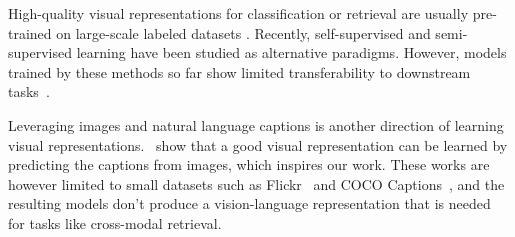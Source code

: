 \documentclass{article}
\begin{document}
High-quality visual representations for classification or retrieval are usually pre-trained on large-scale labeled datasets \cite{mahajan:wsl, kolensnikov:bit, dosovitskiy:vit, juan:graphrise}. Recently, self-supervised \citep{chen:simclr, tian:cmc, he:moco, misra:pirl, li:pcl, grill:byol, caron:swav} and semi-supervised learning \citep{yalniz2019billion, xie:noisy_student, pham:mpl} have been studied as alternative paradigms. %
However, models trained by these methods so far show limited transferability to downstream tasks~\cite{zoph2020rethinking}. %


Leveraging images and natural language captions is another direction of learning visual representations.~\citet{joulin:flickr,li:ngram,desai:virtex,sariyildiz2020learning,zhang2020contrastive} show that a good visual representation can be learned by predicting the captions from images, which inspires our work. These works are however limited to small datasets such as Flickr~\cite{joulin:flickr,li:ngram} and COCO Captions~\cite{desai:virtex,sariyildiz2020learning}, and the resulting models don't produce a vision-language representation that is needed for tasks like cross-modal retrieval.
\end{document}
